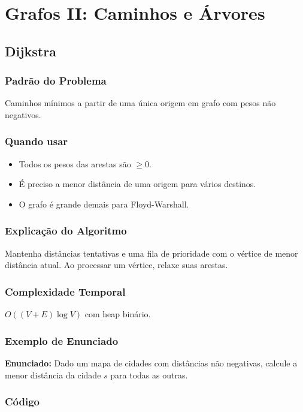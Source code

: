 \chapter{Grafos II: Caminhos e Árvores}

\section{Dijkstra}

\subsection{Padrão do Problema}
Caminhos mínimos a partir de uma única origem em grafo com pesos não negativos.

\subsection{Quando usar}
\begin{itemize}[nosep]
  \item Todos os pesos das arestas são $\geq 0$.
  \item É preciso a menor distância de uma origem para vários destinos.
  \item O grafo é grande demais para Floyd-Warshall.
\end{itemize}

\subsection{Explicação do Algoritmo}
Mantenha distâncias tentativas e uma fila de prioridade com o vértice de menor distância atual. Ao processar um vértice, relaxe suas arestas.

\subsection{Complexidade Temporal}
$O((V + E) \log V)$ com heap binário.

\subsection{Exemplo de Enunciado}
\begin{exemplodiabox}
\textbf{Enunciado:} Dado um mapa de cidades com distâncias não negativas, calcule a menor distância da cidade $s$ para todas as outras.
\end{exemplodiabox}

\subsection{Código}

